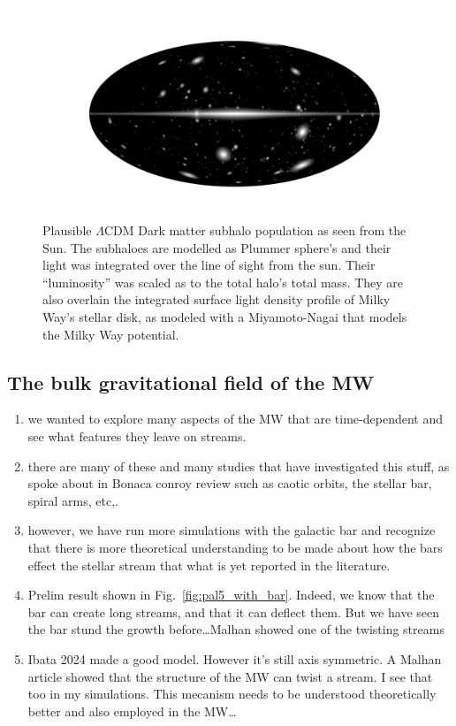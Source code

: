         \begin{figure}
            \includegraphics[width=\linewidth]{images/mollweide-density-with-haloes.png}
            \caption[Plausible $\Lambda$CDM Dark matter subhalo population as seen from the Sun]{Plausible $\Lambda$CDM Dark matter subhalo population as seen from the Sun. The subhaloes are modelled as Plummer sphere's and their light was integrated over the line of sight from the sun. Their ``luminosity'' was scaled as to the total halo's total mass. They are also overlain the integrated surface light density profile of Milky Way's stellar disk, as modeled with a Miyamoto-Nagai that models the Milky Way potential.}
            \label{fig:mollweide-density-with-haloes.png}
        \end{figure}


    \subsection{The bulk gravitational field of the MW}

            \begin{enumerate}
                \item we wanted to explore many aspects of the MW that are time-dependent and see what features they leave on streams. 
                \item there are many of these and many studies that have investigated this stuff, as spoke about in Bonaca conroy review such as caotic orbits, the stellar bar, spiral arms, etc,. 
                \item however, we have run more simulations with the galactic bar and recognize that there is more theoretical understanding to be made about how the bars effect the stellar stream that what is yet reported in the literature. 
                \item Prelim result shown in Fig.~\ref{fig:pal5_with_bar}. Indeed, we know that the bar can create long streams, and that it can deflect them. But we have seen the bar stund the growth before\dots Malhan showed one of the twisting streams 
                \item Ibata 2024 made a good model. However it's still axis symmetric. A Malhan article showed that the structure of the MW can twist a stream. I see that too in my simulations. This mecanism needs to be understood theoretically better and also employed in the MW\dots
            \end{enumerate}


